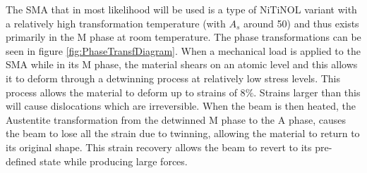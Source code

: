 The SMA that in most likelihood will be used is a type of NiTiNOL variant with a relatively high transformation temperature (with $A_s$ around 50\degreeC) and thus exists primarily in the M phase at room temperature. The phase transformations can be seen in figure \ref{fig:PhaseTransfDiagram}. When a mechanical load is applied to the SMA while in its M phase, the material shears on an atomic level and this allows it to deform through a detwinning process at relatively low stress levels. This process allows the material to deform up to strains of 8$\%$. Strains larger than this will cause dislocations which are irreversible. When the beam is then heated, the Austentite transformation from the detwinned M phase to the A phase, causes the beam to lose all the strain due to twinning, allowing the material to return to its original shape. This strain recovery allows the beam to revert to its pre-defined state while producing large forces.

